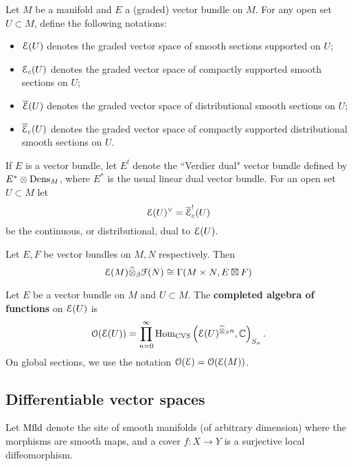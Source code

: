 \documentclass[10pt, oneside]{article}
\begin{document}
\begin{definition}
Let $M$ be a manifold and $E$ a (graded) vector bundle on $M$.  
For any open set $U \subset M$, define the following notations:
\begin{itemize}
\item $\mathcal E(U)$ denotes the graded vector space of smooth sections supported on $U$;
\item $\mathcal E_c(U)$ denotes the graded vector space of compactly supported smooth sections on $U$;
\item $\overline{\mathcal E}(U)$ denotes the graded vector space of distributional smooth sections on $U$;
\item $\overline{\mathcal E}_c(U)$ denotes the graded vector space of compactly supported distributional smooth sections on $U$.
\end{itemize}
\end{definition}

If $E$ is a vector bundle, let $E^!$ denote the ``Verdier dual" vector bundle defined by $E^* \otimes {\rm Dens}_M$, where $E^*$ is the usual linear dual vector bundle. 
For an open set $U \subset M$ let 
\[
\mathcal E(U)^\vee = \overline{\mathcal E}^!_c(U)
\]
be the continuous, or distributional, dual to $\mathcal E(U)$. 


\begin{prop}
Let $E,F$ be vector bundles on $M,N$ respectively.
Then
\[
\mathcal E(M) \widehat{\otimes}_\beta \mathcal F(N) \cong \Gamma(M \times N, E \boxtimes F)
\]
\end{prop}

\begin{definition}\label{dfn: fnl}
Let $E$ be a vector bundle on $M$ and $U \subset M$.
The {\bf completed algebra of functions} on $\mathcal E(U)$ is
\[
\mathcal O(\mathcal E(U)) = \prod_{n = 0}^\infty {\rm Hom}_{\rm CVS} \left(\mathcal E(U)^{\widehat{\otimes}_\beta n}, \mathbb C\right)_{S_n} .
\]
On global sections, we use the notation $\mathcal O(\mathcal E) = \mathcal O(\mathcal E(M))$. 
\end{definition}

\subsection{Differentiable vector spaces}
\def\Mfld{{\rm Mfld}}

Let $\Mfld$ denote the site of smooth manifolds (of arbitrary dimension) where the morphisms are smooth maps, and a cover $f : X \to Y$ is a surjective local diffeomorphism.  
\end{document}
